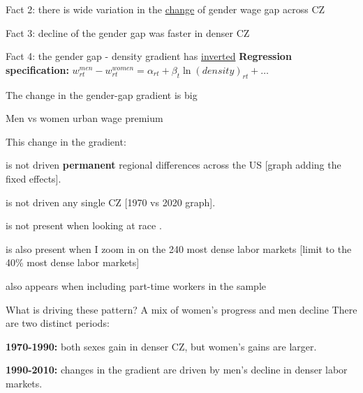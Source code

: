 \begin{frame}{Fact 2: there is wide variation in the \underline{change} of gender wage gap across CZ}

\end{frame}
\begin{frame}{Fact 3: decline of the gender gap was faster in denser CZ}  				
	
\end{frame}
\begin{frame}{Fact 4: the gender gap - density gradient has \underline{inverted}}
	\label{slide:baseline}
	\textbf{\alert{Regression specification:}}	$w^{men}_{rt}-w^{women}_{rt}=\alpha_{rt}+\beta_{t}\ln(density)_{rt}+ \dots$
	
\end{frame}
\begin{frame}{The change in the gender-gap gradient is big}
	\bitem
		\item 
		\item Men vs women urban wage premium
	\eitem
\end{frame}
\begin{frame}{}
This change in the gradient:
\bitem
	\item is not driven \textbf{\alert{permanent}} regional differences across the US [graph adding the fixed effects].
	\item is not driven any single CZ [1970 vs 2020 graph].
	\item is not present when looking at race .
	\item is also present when I zoom in on the 240 most dense labor markets [limit to the 40\% most dense labor markets]
	\item also appears when including part-time workers in the sample
\eitem	
{} \hspace{.5cm} 		 \hspace{.5cm} 	\hspace{.5cm}		
\end{frame}

\begin{frame}{What is driving these pattern? A mix of women's progress and men decline}
	There are two distinct periods:
	\bitem
		\item \textbf{\alert{1970-1990}:} both sexes gain in denser CZ, but women's gains are larger.
		\item \textbf{\alert{1990-2010}:} changes in the gradient are driven by men's decline in denser labor markets.
	\eitem
	
\end{frame}


